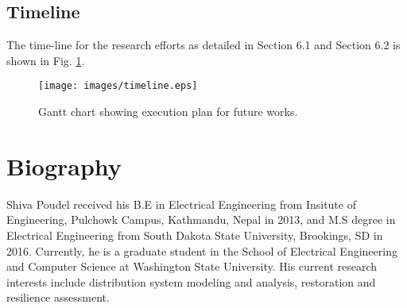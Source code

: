 \documentclass[12pt]{article}
\begin{document}
\subsection{Timeline}
The time-line for the research efforts as detailed in Section 6.1 and Section 6.2 is shown in Fig. \ref{fig:time}.

\begin{figure}[h]
\centering
\texttt{[image: images/timeline.eps]}
  \vspace{-0.2 cm}
  \caption{\small Gantt chart showing execution plan for future works.}
\label{fig:time}
\end{figure}


\newpage
\section{Biography}
\small
Shiva Poudel received his B.E in Electrical Engineering from Insitute of Engineering, Pulchowk Campus, Kathmandu, Nepal in 2013, and M.S degree in Electrical Engineering from South Dakota State University, Brookings, SD in 2016. Currently, he is a graduate student in the School of
Electrical Engineering and Computer Science at Washington State University. His current research interests include distribution system modeling and analysis, restoration and resilience assessment.
\singlespacing
\end{document}
